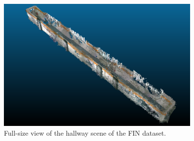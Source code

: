 \documentclass[main.tex]{subfiles}
\begin{document}
\begin{figure}[H]
    \centering
    \includegraphics[width=0.9\textwidth]{images/hallway.png}
    \caption[FIN Hallway Scene]{Full-size view of the hallway scene of the FIN dataset.}
    \label{fig:finhw-app}
\end{figure}
\end{document}
